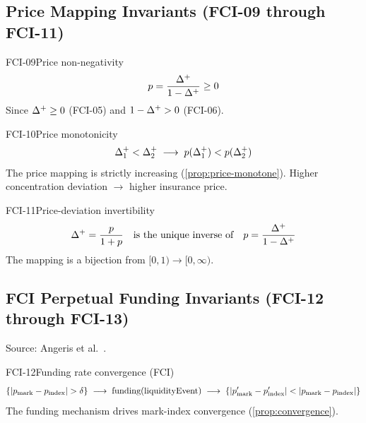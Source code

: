 \subsection{Price Mapping Invariants (FCI-09 through FCI-11)}

\begin{invariant}{FCI-09}{Price non-negativity}
\[
  p = \frac{\Delta^{+}}{1 - \Delta^{+}} \geq 0
\]
Since $\Delta^{+} \geq 0$ (FCI-05) and $1 - \Delta^{+} > 0$ (FCI-06).
\end{invariant}

\begin{invariant}{FCI-10}{Price monotonicity}
\[
  \Delta^{+}_1 < \Delta^{+}_2
  \;\longrightarrow\;
  p(\Delta^{+}_1) < p(\Delta^{+}_2)
\]
The price mapping is strictly increasing (\cref{prop:price-monotone}).
Higher concentration deviation $\to$ higher insurance price.
\end{invariant}

\begin{invariant}{FCI-11}{Price-deviation invertibility}
\[
  \Delta^{+} = \frac{p}{1 + p}
  \quad\text{is the unique inverse of}\quad
  p = \frac{\Delta^{+}}{1 - \Delta^{+}}
\]
The mapping is a bijection from $[0,1) \to [0,\infty)$.
\end{invariant}

\subsection{FCI Perpetual Funding Invariants (FCI-12 through FCI-13)}

Source: Angeris et al.\ \cite{angeris2022perpetuals}.

\begin{invariant}{FCI-12}{Funding rate convergence (FCI)}
\[
  \{|p_{\text{mark}} - p_{\text{index}}| > \delta\}
  \;\longrightarrow\; \text{funding}(\text{liquidityEvent})
  \;\longrightarrow\; \{|p_{\text{mark}}' - p_{\text{index}}'| < |p_{\text{mark}} - p_{\text{index}}|\}
\]
The funding mechanism drives mark-index convergence (\cref{prop:convergence}).
\end{invariant}

